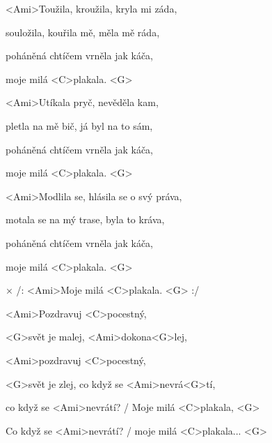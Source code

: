 

\zs
<Ami>Toužila, kroužila, kryla mi záda,

souložila, kouřila mě, měla mě ráda,

poháněná chtíčem vrněla jak káča,

moje milá <C>plakala. <G>
\ks

\zs
<Ami>Utíkala pryč, nevěděla kam,

pletla na mě bič, já byl na to sám,

poháněná chtíčem vrněla jak káča,

moje milá <C>plakala. <G>
\ks

\zs
<Ami>Modlila se, hlásila se o svý práva,

motala se na mý trase, byla to kráva,

poháněná chtíčem vrněla jak káča,

moje milá <C>plakala. <G>
\ks

× /: <Ami>Moje milá <C>plakala. <G> :/

<Ami>Pozdravuj <C>pocestný,

<G>svět je malej, <Ami>dokona<G>lej,

<Ami>pozdravuj <C>pocestný,

<G>svět je zlej, co když se <Ami>nevrá<G>tí,

co když se <Ami>nevrátí? / Moje milá <C>plakala, <G>

Co když se <Ami>nevrátí? / moje milá <C>plakala... <G>

\kr

\kp
